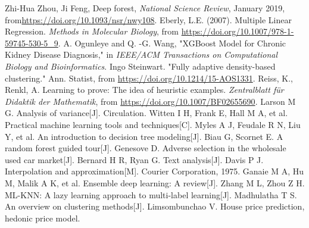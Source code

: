 \documentclass[12pt]{article}  %
\begin{document}
\clearpage

\begin{thebibliography}{99}
 Zhi-Hua Zhou, Ji Feng, Deep forest, \emph{National Science Review}, January 2019, from\url{https://doi.org/10.1093/nsr/nwy108}.
 Eberly, L.E. (2007). Multiple Linear Regression. \emph{Methods in Molecular Biology}, from \url{https://doi.org/10.1007/978-1-59745-530-5_9}.
 A. Ogunleye and Q. -G. Wang, "XGBoost Model for Chronic Kidney Disease Diagnosis," in \emph{IEEE/ACM Transactions on Computational Biology and Bioinformatics}.
 Ingo Steinwart. "Fully adaptive density-based clustering." Ann. Statist, from \url{https://doi.org/10.1214/15-AOS1331}.
 Reiss, K., Renkl, A. Learning to prove: The idea of heuristic examples. \emph{Zentralblatt für Didaktik der Mathematik}, from \url{https://doi.org/10.1007/BF02655690}.
 Larson M G. Analysis of variance[J]. Circulation.
 Witten I H, Frank E, Hall M A, et al. Practical machine learning tools and techniques[C].
 Myles A J, Feudale R N, Liu Y, et al. An introduction to decision tree modeling[J].
 Biau G, Scornet E. A random forest guided tour[J].
 Genesove D. Adverse selection in the wholesale used car market[J].
 Bernard H R, Ryan G. Text analysis[J]. 
 Davis P J. Interpolation and approximation[M]. Courier Corporation, 1975.
 Ganaie M A, Hu M, Malik A K, et al. Ensemble deep learning: A review[J].
 Zhang M L, Zhou Z H. ML-KNN: A lazy learning approach to multi-label learning[J].
 Madhulatha T S. An overview on clustering methods[J].
 Limsombunchao V. House price prediction, hedonic price model.
\end{thebibliography}
\end{document}
